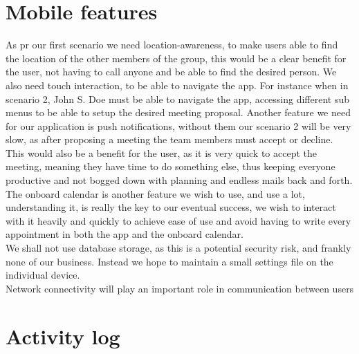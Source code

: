 \documentclass{article}
\begin{document}
\section{Mobile features}


As pr our first scenario we need location-awareness, to make users able to find the location of the other members of the group, this would be a clear benefit for the user, not having to call anyone and be able to find the desired person. We also need touch interaction, to be able to navigate the app. For instance when in scenario 2, John S. Doe must be able to navigate the app, accessing different sub menus to be able to setup the desired meeting proposal. Another feature we need for our application is push notifications, without them our scenario 2 will be very slow, as after proposing a meeting the team members must accept or decline. This would also be a benefit for the user, as it is very quick to accept the meeting, meaning they have time to do something else, thus keeping everyone productive and not bogged down with planning and endless mails back and forth. The onboard calendar is another feature we wish to use, and use a lot, understanding it, is really the key to our eventual success, we wish to interact with it heavily and quickly to achieve ease of use and avoid having to write every appointment in both the app and the onboard calendar.\\
We shall not use database storage, as this is a potential security risk, and frankly none of our business. Instead we hope to maintain a small settings file on the individual device.\\
Network connectivity will play an important role in communication between users

\section{Activity log}
\end{document}
